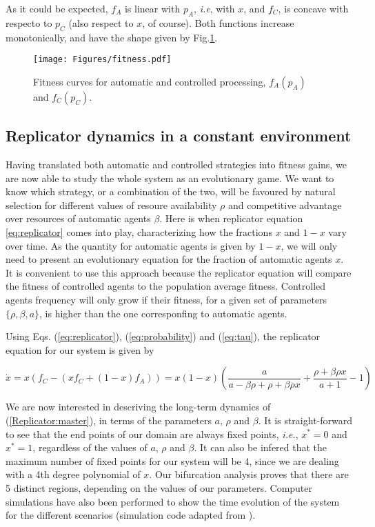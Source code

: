 \documentclass[10pt,a4paper]{article}
\begin{document}
As it could be expected, $f_A$ is linear with $p_A$, \emph{i.e}, with $x$, and $f_C$, is concave with respecto to $p_C$ (also respect to $x$, of course). Both
functions increase monotonically, and have the shape given by Fig.\ref{fig:fitness}.

\begin{figure}[h!]
\centering
\vspace{-2cm}
\texttt{[image: Figures/fitness.pdf]}
\vspace{-0.3cm}
\caption{Fitness curves for automatic and controlled processing, $f_A(p_A)$ and $f_C(p_C)$.}
\label{fig:fitness}
\end{figure}

\subsection{Replicator dynamics in a constant environment}

Having translated both automatic and controlled strategies into fitness gains, we are now able to study the whole system as an evolutionary game. We want to know
which strategy, or a combination of the two, will be favoured by natural selection for different values of resoure availability $\rho$ and competitive advantage 
over resources of automatic agents $\beta$. Here is when replicator equation \ref{eq:replicator} comes into play, characterizing how the fractions $x$ and $1-x$ 
vary over time. As the quantity for automatic agents is given by $1-x$, we will only need to present an evolutionary equation for the 
fraction of automatic agents $x$. 
It is convenient to use this approach because the replicator equation will compare the fitness of controlled agents to the population average fitness. Controlled
agents frequency will only grow if their fitness, for a given set of parameters $\{\rho,\beta,a\}$, is higher than the one corresponfing to automatic agents.

Using Eqs. (\ref{eq:replicator}), (\ref{eq:probability}) and (\ref{eq:tau}), the replicator equation for our system is given by

\begin{equation}
\dot{x} = x(f_C - (xf_C+(1-x)f_A)) = x(1-x)\displaystyle\left( \frac{a}{a-\beta\rho+\rho+\beta\rho x} + \frac{\rho+\beta\rho x}{a+1} -1 \right)
 \label{Replicator:master}
\end{equation}

We are now interested in descriving the long-term dynamics of (\ref{Replicator:master}), in terms of the parameters $a$, $\rho$ and $\beta$. It is straight-forward
to see that the end points of our domain are always fixed points, \emph{i.e.}, $x^* = 0$ and $x^* = 1$, regardless of the values of $a$, $\rho$ and $\beta$. 
It can also be infered that the maximum number of fixed points for our system will be 4, since we are dealing with a 4th degree polynomial of $x$. Our bifurcation 
analysis proves that there are 5 distinct regions, depending on the values of our parameters. Computer simulations have also been performed to show the time evolution of the system
for the different scenarios (simulation code adapted from \cite{Simulations:code}).
\end{document}
